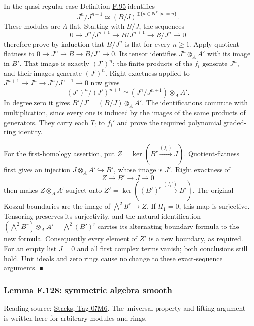 \documentclass[11pt,a4paper,openany]{report}
\begin{document}
In the quasi-regular case Definition \hyperref[AG-RG-S05-more-algebra-definition-regular-ideal]{F.95} identifies \[J^n/J^{n+1}\simeq (B/J)^{\oplus\{a\in\mathbf N^r:|a|=n\}}.\] These modules are \(A\)-flat. Starting with \(B/J\), the sequences \[0\to J^n/J^{n+1}\to B/J^{n+1}\to B/J^n\to0\] therefore prove by induction that \(B/J^n\) is flat for every \(n\geq1\). Apply quotient-flatness to \(0\to J^n\to B\to B/J^n\to0\). Its tensor identifies \(J^n\otimes_A A'\) with its image in \(B'\). That image is exactly \((J')^n\): the finite products of the \(f_i\) generate \(J^n\), and their images generate \((J')^n\). Right exactness applied to \(J^{n+1}\to J^n\to J^n/J^{n+1}\to0\) now gives \[ (J')^n/(J')^{n+1}\simeq (J^n/J^{n+1})\otimes_A A'. \] In degree zero it gives \(B'/J'=(B/J)\otimes_A A'\). The identifications commute with multiplication, since every one is induced by the images of the same products of generators. They carry each \(T_i\) to \(f_i'\) and prove the required polynomial graded-ring identity.

For the first-homology assertion, put \(Z=\ker(B^r\xrightarrow{(f_i)}J)\). Quotient-flatness first gives an injection \(J\otimes_A A'\hookrightarrow B'\), whose image is \(J'\). Right exactness of \[Z\longrightarrow B^r\longrightarrow J\longrightarrow0\] then makes \(Z\otimes_A A'\) surject onto \(Z'=\ker((B')^r\xrightarrow{(f_i')}B')\). The original Koszul boundaries are the image of \(\bigwedge^2 B^r\to Z\). If \(H_1=0\), this map is surjective. Tensoring preserves its surjectivity, and the natural identification \((\bigwedge^2 B^r)\otimes_A A'=\bigwedge^2(B')^r\) carries its alternating boundary formula to the new formula. Consequently every element of \(Z'\) is a new boundary, as required. For an empty list \(J=0\) and all first complex terms vanish; both conclusions still hold. Unit ideals and zero rings cause no change to these exact-sequence arguments. ∎

\label{AG-RG-S05-more-algebra-lemma-symmetric-algebra-smooth}

\subsubsection{Lemma F.128: symmetric algebra smooth}\label{AG-RG-S05-lemma-f.128-symmetric-algebra-smooth}

Reading source: \href{https://stacks.math.columbia.edu/tag/07M6}{Stacks, Tag 07M6}. The universal-property and lifting argument is written here for arbitrary modules and rings.
\end{document}
